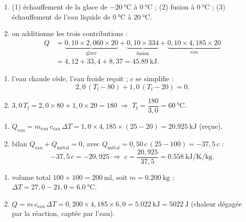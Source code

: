 \documentclass[11pt,a4paper]{article}
\begin{document}
\begin{corrige}
\begin{enumerate}[label=\alph*)]
  \item (1) échauffement de la glace de $\qty{-20}{\celsius}$ à $\qty{0}{\celsius}$ ; (2) fusion à $\qty{0}{\celsius}$ ; (3) échauffement de l'eau liquide de $\qty{0}{\celsius}$ à $\qty{20}{\celsius}$.
  \item on additionne les trois contributions :
  \begin{align*}
    Q &= \underbrace{0{,}10\times 2{,}060\times 20}_{\text{glace}} + \underbrace{0{,}10\times 334}_{\text{fusion}} + \underbrace{0{,}10\times 4{,}185\times 20}_{\text{eau}}\\
      &= 4{,}12 + 33{,}4 + 8{,}37 = \qty{45.89}{\kilo\joule}.
  \end{align*}
\end{enumerate}
\end{corrige}

\begin{corrige}
\begin{enumerate}[label=\alph*)]
  \item l'eau chaude cède, l'eau froide reçoit ; $c$ se simplifie :
  \[ 2{,}0\,(T_{\text{f}}-80) + 1{,}0\,(T_{\text{f}}-20) = 0. \]
  \item $3{,}0\,T_{\text{f}} = 2{,}0\times 80 + 1{,}0\times 20 = 180 \;\Rightarrow\; T_{\text{f}} = \dfrac{180}{3{,}0} = \qty{60}{\celsius}$.
\end{enumerate}
\end{corrige}

\begin{corrige}
\begin{enumerate}[label=\alph*)]
  \item $Q_{\text{eau}} = m_{\text{eau}}\,c_{\text{eau}}\,\Delta T = 1{,}0\times 4{,}185\times(25-20) = \qty{20.925}{\kilo\joule}$ (reçue).
  \item bilan $Q_{\text{eau}} + Q_{\text{métal}} = 0$, avec $Q_{\text{métal}} = 0{,}50\,c\,(25-100) = -37{,}5\,c$ :
  \[ -37{,}5\,c = -20{,}925 \;\Rightarrow\; c = \dfrac{20{,}925}{37{,}5} = \qty{0.558}{\kilo\joule\per\kelvin\per\kilogram}. \]
\end{enumerate}
\end{corrige}

\begin{corrige}
\begin{enumerate}[label=\alph*)]
  \item volume total $100+100=\qty{200}{\milli\litre}$, soit $m=\qty{0.200}{\kilogram}$ ; $\Delta T = 27{,}0-21{,}0 = \qty{6.0}{\celsius}$.
  \item $Q = m\,c_{\text{eau}}\,\Delta T = 0{,}200\times 4{,}185\times 6{,}0 = \qty{5.022}{\kilo\joule} = \qty{5022}{\joule}$ (chaleur dégagée par la réaction, captée par l'eau).
\end{enumerate}
\end{corrige}
\end{document}
